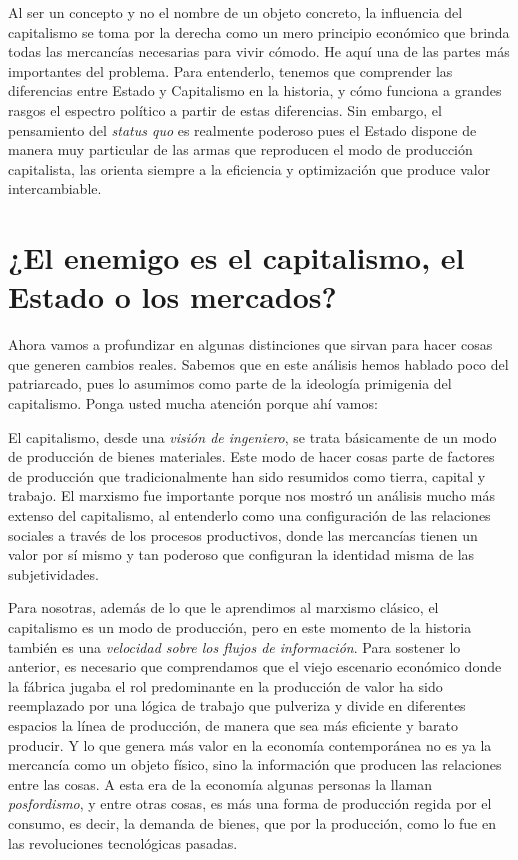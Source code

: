 Al ser un concepto y no el nombre de un objeto concreto, la influencia del capitalismo se toma por la derecha como un mero principio económico que brinda todas las mercancías necesarias para vivir cómodo. He aquí una de las partes más importantes del problema. Para entenderlo, tenemos que comprender las diferencias entre Estado y Capitalismo en la historia, y cómo funciona a grandes rasgos el espectro político a partir de estas diferencias. Sin embargo, el pensamiento del \emph{status quo} es realmente poderoso pues el Estado dispone de manera muy particular de las armas que reproducen el modo de producción capitalista, las orienta siempre a la eficiencia y optimización que produce valor intercambiable.

\section{¿El enemigo es el capitalismo, el Estado o los mercados?}
\label{sec:enemigos}

Ahora vamos a profundizar en algunas distinciones que sirvan para hacer cosas que generen cambios reales. Sabemos que en este análisis hemos hablado poco del patriarcado, pues lo asumimos como parte de la ideología primigenia del capitalismo. Ponga usted mucha atención porque ahí vamos:

El capitalismo, desde una \emph{visión de ingeniero}, se trata básicamente de un modo de producción de bienes materiales. Este modo de hacer cosas parte de factores de producción que tradicionalmente han sido resumidos como tierra, capital y trabajo. El marxismo fue importante porque nos mostró un análisis mucho más extenso del capitalismo, al entenderlo como una configuración de las relaciones sociales a través de los procesos productivos, donde las mercancías tienen un valor por sí mismo y tan poderoso que configuran la identidad misma de las subjetividades.

Para nosotras, además de lo que le aprendimos al marxismo clásico, el capitalismo es un modo de producción, pero en este momento de la historia también es una \emph{velocidad sobre los flujos de información}. Para sostener lo anterior, es necesario que comprendamos que el viejo escenario económico donde la fábrica jugaba el rol predominante en la producción de valor ha sido reemplazado por una lógica de trabajo que pulveriza y divide en diferentes espacios la línea de producción, de manera que sea más eficiente y barato producir. Y lo que genera más valor en la economía contemporánea no es ya la mercancía como un objeto físico, sino la información que producen las relaciones entre las cosas. A esta era de la economía algunas personas la llaman \emph{posfordismo}, y entre otras cosas, es más una forma de producción regida por el consumo, es decir, la demanda de bienes, que por la producción, como lo fue en las revoluciones tecnológicas pasadas.

